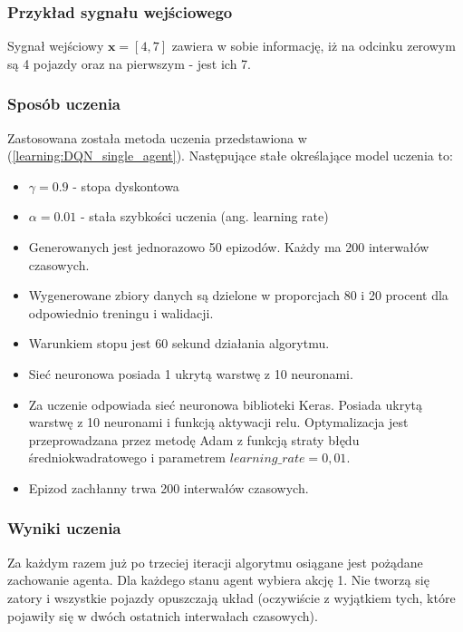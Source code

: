 \documentclass[12pt]{book}
\theoremstyle{plain}
\newcommand{\myref}[1]{(\ref{#1})}
\begin{document}
\subsubsection*{Przykład sygnału wejściowego}
Sygnał wejściowy $ \textbf{x}=[4,7] $ zawiera w sobie informację, iż na odcinku zerowym są 4 pojazdy oraz na pierwszym - jest ich 7. 
\subsubsection*{Sposób uczenia}
Zastosowana została metoda uczenia przedstawiona w \myref{learning:DQN_single_agent}. Następujące stałe określające model uczenia to:
\begin{itemize}
	\item $\gamma = 0.9$ - stopa dyskontowa
	\item $\alpha = 0.01$ - stała szybkości uczenia (ang. learning rate)
	\item Generowanych jest jednorazowo 50 epizodów. Każdy ma 200 interwałów czasowych.
	\item Wygenerowane zbiory danych są dzielone w proporcjach 80 i 20 procent dla odpowiednio treningu i walidacji.
	\item Warunkiem stopu jest 60 sekund działania algorytmu.
	\item Sieć neuronowa posiada 1 ukrytą warstwę z 10 neuronami.
	\item Za uczenie odpowiada sieć neuronowa biblioteki Keras. Posiada ukrytą warstwę z 10 neuronami i funkcją aktywacji relu. Optymalizacja jest przeprowadzana przez metodę Adam z funkcją straty błędu średniokwadratowego i parametrem $learning\_rate = 0,01$. 
	\item Epizod zachłanny trwa 200 interwałów czasowych.
\end{itemize}

\subsubsection{Wyniki uczenia}
Za każdym razem już po trzeciej iteracji algorytmu osiągane jest pożądane zachowanie agenta. Dla każdego stanu agent wybiera akcję 1. Nie tworzą się zatory i wszystkie pojazdy opuszczają układ (oczywiście z wyjątkiem tych, które pojawiły się w dwóch ostatnich interwałach czasowych).
\end{document}
